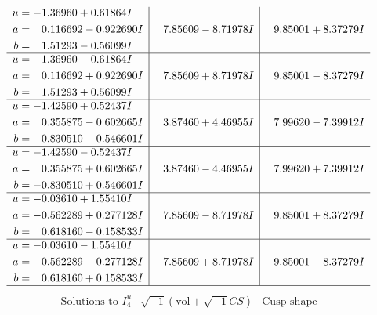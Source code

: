 \documentclass[1p]{elsarticle_modified}
\theoremstyle{definition}
\newcommand{\I}{\sqrt{-1}}
\begin{document}
$$\begin{array}{c|c|c}
\begin{aligned}
u &= -1.36960 + 0.61864 I \\
a &= \phantom{-}0.116692 - 0.922690 I \\
b &= \phantom{-}1.51293 - 0.56099 I\end{aligned}
 & \phantom{-}7.85609 - 8.71978 I & \phantom{-}9.85001 + 8.37279 I \\ \hline\begin{aligned}
u &= -1.36960 - 0.61864 I \\
a &= \phantom{-}0.116692 + 0.922690 I \\
b &= \phantom{-}1.51293 + 0.56099 I\end{aligned}
 & \phantom{-}7.85609 + 8.71978 I & \phantom{-}9.85001 - 8.37279 I \\ \hline\begin{aligned}
u &= -1.42590 + 0.52437 I \\
a &= \phantom{-}0.355875 - 0.602665 I \\
b &= -0.830510 - 0.546601 I\end{aligned}
 & \phantom{-}3.87460 + 4.46955 I & \phantom{-}7.99620 - 7.39912 I \\ \hline\begin{aligned}
u &= -1.42590 - 0.52437 I \\
a &= \phantom{-}0.355875 + 0.602665 I \\
b &= -0.830510 + 0.546601 I\end{aligned}
 & \phantom{-}3.87460 - 4.46955 I & \phantom{-}7.99620 + 7.39912 I \\ \hline\begin{aligned}
u &= -0.03610 + 1.55410 I \\
a &= -0.562289 + 0.277128 I \\
b &= \phantom{-}0.618160 - 0.158533 I\end{aligned}
 & \phantom{-}7.85609 - 8.71978 I & \phantom{-}9.85001 + 8.37279 I \\ \hline\begin{aligned}
u &= -0.03610 - 1.55410 I \\
a &= -0.562289 - 0.277128 I \\
b &= \phantom{-}0.618160 + 0.158533 I\end{aligned}
 & \phantom{-}7.85609 + 8.71978 I & \phantom{-}9.85001 - 8.37279 I\\
 \hline 
 \end{array}$$\newpage$$\begin{array}{c|c|c}  
\text{Solutions to }I^u_{4}& \I (\text{vol} + \sqrt{-1}CS) & \text{Cusp shape}\\

\end{array}$$
\end{document}
